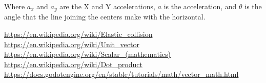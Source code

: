 \documentclass{amsart}
\begin{document}
Where $a_x$ and $a_y$ are the X and Y accelerations, $a$ is the acceleration,
and $\theta$ is the angle that the line joining the centers make with the
horizontal.

\newpage

\begin{thebibliography}{9}
  \url{https://en.wikipedia.org/wiki/Elastic_collision}
  \url{https://en.wikipedia.org/wiki/Unit_vector}
  \url{https://en.wikipedia.org/wiki/Scalar_(mathematics)}
  \url{https://en.wikipedia.org/wiki/Dot_product}
  \url{https://docs.godotengine.org/en/stable/tutorials/math/vector_math.html}
\end{thebibliography}
\end{document}
